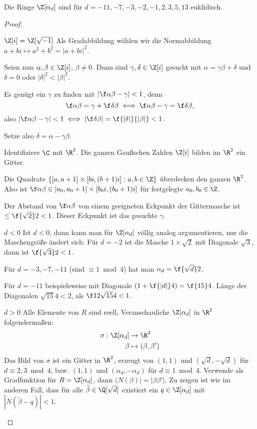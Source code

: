 \begin{st} \label{4.9}
	Die Ringe $\Z[\alpha_d]$ sind für $d = -11, -7, -3, -2, -1, 2, 3, 5, 13$ euklidisch.
	\begin{proof}
		\begin{segnb}{$\Z[i] = \Z[\sqrt{-1}]$}
			Als Gradabbildung wählen wir die Normabbildung $a + bi \mapsto a^2 + b^2 = |a + bi|^2$.

			Seien nun $\alpha, \beta \in \Z[i]$, $\beta \neq 0$.
			Dann sind $\gamma, \delta \in \Z[i]$ gesucht mit $\alpha = \gamma \beta + \delta$ und $\delta = 0$ oder $|\delta|^2 < |\beta|^2$.

			Es genügt ein $\gamma$ zu finden mit $| \f \alpha\beta - \gamma | < 1$, denn
			\[
				\f \alpha\beta = \gamma + \f \delta\beta
				\iff \f \alpha\beta - \gamma = \f \delta \beta,
			\]
			also $| \f \alpha \beta - \gamma | < 1 \iff |\f \delta \beta| = \f {|\delta|}{|\beta|} < 1$.

			Setze also $\delta = \alpha - \gamma \beta$.

			Identifiziere $\C$ mit $\R^2$.
			Die ganzen Gaußschen Zahlen $\Z[i]$ bilden im $\R^2$ ein Gitter.

			Die Quadrate $\{[a, a+1] \times [bi, (b+1)i]: a,b \in \Z\}$ überdecken den ganzen $\R^2$.
			Also ist $\f \alpha\beta \in [a_0, a_0 + 1] \times [b_0 i, (b_0+1)i]$ für festgelegte $a_0, b_0 \in \Z$.

			Der Abstand von $\f \alpha\beta$ von einem geeigneten Eckpunkt der Gittermasche ist $\le \f{\sqrt 2}2 < 1$.
			Dieser Eckpunkt ist das gesuchte $\gamma$.
		\end{segnb}
		\begin{segnb}{$d < 0$}
			Ist $d < 0$, dann kann man für $\Z[\alpha_d]$ völlig analog argumentieren, nur die Maschengröße ändert sich:
			Für $d = -2$ ist die Masche $1 \times \sqrt 2$ mit Diagonale $\sqrt 3$, dann ist $\f {\sqrt 3}2 < 1$.

			Für $d = -3, -7, -11$ (sind $\equiv 1 \bmod 4$) hat man $\alpha_d = \f {\sqrt{d}}2$.


			Für $d = -11$ beispielsweise mit Diagonale $(1 + \f {|d|}4) = \f {15}4$.
			Länge der Diagonalen $\sqrt{15}{4} < 2$, als $\f 12 \sqrt{15}{4} < 1$.
		\end{segnb}
		\begin{segnb}{$d > 0$}
			Alle Elemente von $R$ sind reell, Veranschauliche $\Z[\alpha_d]$ in $\R^2$ folgendermaßen:
			\begin{align*}
				\sigma: \Z[\alpha_d] &\to \R^2 \\
				\beta &\mapsto (\beta, \beta')
			\end{align*}
			Das Bild von $\sigma$ ist ein Gitter in $\R^2$, erzeugt von $(1,1)$ und $(\sqrt d, -\sqrt d)$ für $d \equiv 2,3 \bmod 4$, bzw. $(1,1)$ und $(\alpha_d, -\alpha_d)$ für $d \equiv 1 \bmod 4$.
			Verwende als Gradfunktion für $R = \Z[\alpha_d]$, dann $(N(\beta)| = |\beta \beta'|$.
			Zu zeigen ist wie im anderen Fall, dass für alle $\tilde \beta \in \Q[\sqrt d]$ existiert ein $q \in \Z[\alpha_d]$ mit $|N(\tilde \beta - q)| < 1$.


\end{segnb}
\end{proof}
\end{st}
